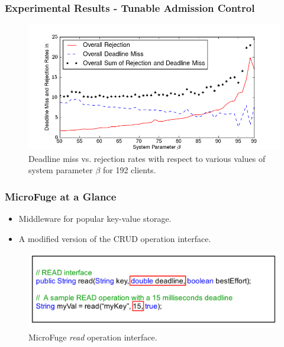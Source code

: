 \documentclass{beamer}
\newcommand{\myv}{\vspace{3 mm}}
\begin{document}
\begin{frame}
  \frametitle{Experimental Results - Tunable Admission Control}
  \begin{figure}[t]
    \begin{center}
      \centerline{\includegraphics[scale=0.5]{img/EC2/Varying_ac/varying_acPerc_192.png}}
      \caption{Deadline miss vs. rejection rates with respect to various values of
        system parameter $\beta$ for 192 clients.}
      \label{fig:varying_ac}
    \end{center}
  \end{figure}
\end{frame}

\begin{frame}
  \frametitle{MicroFuge at a Glance}
  \begin{itemize}
  \item Middleware for popular key-value storage.
    \myv
  \item A modified version of the CRUD operation interface.
  \end{itemize}
  \begin{figure}
    \vspace{-5 mm}
    \includegraphics[scale=0.15]{img/MicroFuge_protocol.png}
    \caption{MicroFuge \textit{read} operation interface.}
  \end{figure}
\end{frame}
\end{document}
